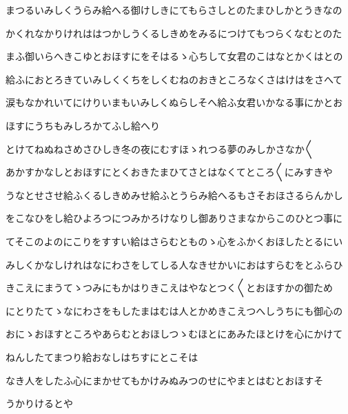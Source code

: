 \documentclass[a4paper,11pt,landscape]{ltjtarticle}
\begin{document}
まつるいみしくうらみ給へる御けしきにてもらさしとのたまひしかとうきなの
\par\medskip
かくれなかりけれははつかしうくるしきめをみるにつけてもつらくなむとのた
\par\medskip
まふ御いらへきこゆとおほすにをそはるゝ心ちして女君のこはなとかくはとの
\par\medskip
給ふにおとろきていみしくくちをしくむねのおきところなくさはけはをさへて
\par\medskip
涙もなかれいてにけりいまもいみしくぬらしそへ給ふ女君いかなる事にかとお
\par\medskip
ほすにうちもみしろかてふし給へり
\par\medskip
とけてねぬねさめさひしき冬の夜にむすほゝれつる夢のみしかさなか〱
\par\medskip
あかすかなしとおほすにとくおきたまひてさとはなくてところ〱にみすきや
\par\medskip
うなとせさせ給ふくるしきめみせ給ふとうらみ給へるもさそおほさるらんかし
\par\medskip
をこなひをし給ひよろつにつみかろけなりし御ありさまなからこのひとつ事に
\par\medskip
てそこのよのにこりをすすい給はさらむとものゝ心をふかくおほしたとるにい
\par\medskip
みしくかなしけれはなにわさをしてしる人なきせかいにおはすらむをとふらひ
\par\medskip
きこえにまうてゝつみにもかはりきこえはやなとつく〱とおほすかの御ため
\par\medskip
にとりたてゝなにわさをもしたまはむは人とかめきこえつへしうちにも御心の
\par\medskip
おにゝおほすところやあらむとおほしつゝむほとにあみたほとけを心にかけて
\par\medskip
ねんしたてまつり給おなしはちすにとこそは
\par\medskip
なき人をしたふ心にまかせてもかけみぬみつのせにやまとはむとおほすそ
\par\medskip
うかりけるとや
\par\medskip
\end{document}
